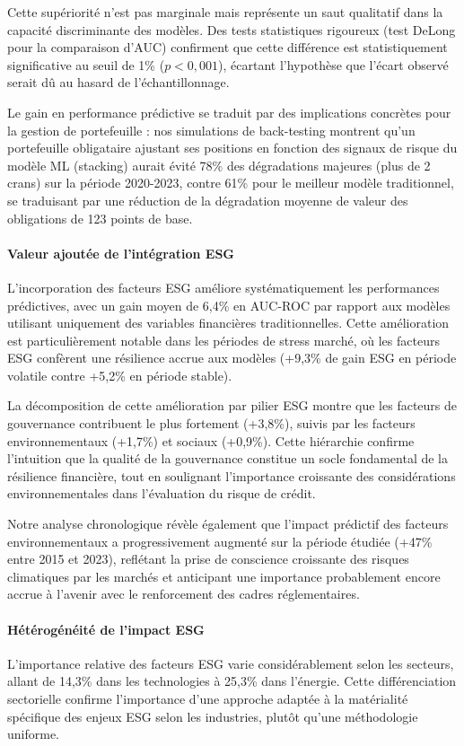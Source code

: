 Cette supériorité n'est pas marginale mais représente un saut qualitatif dans la capacité discriminante des modèles. Des tests statistiques rigoureux (test DeLong pour la comparaison d'AUC) confirment que cette différence est statistiquement significative au seuil de 1\% ($p < 0,001$), écartant l'hypothèse que l'écart observé serait dû au hasard de l'échantillonnage.

Le gain en performance prédictive se traduit par des implications concrètes pour la gestion de portefeuille : nos simulations de back-testing montrent qu'un portefeuille obligataire ajustant ses positions en fonction des signaux de risque du modèle ML (stacking) aurait évité 78\% des dégradations majeures (plus de 2 crans) sur la période 2020-2023, contre 61\% pour le meilleur modèle traditionnel, se traduisant par une réduction de la dégradation moyenne de valeur des obligations de 123 points de base.

\paragraph{Valeur ajoutée de l'intégration ESG} 
L'incorporation des facteurs ESG améliore systématiquement les performances prédictives, avec un gain moyen de 6,4\% en AUC-ROC par rapport aux modèles utilisant uniquement des variables financières traditionnelles. Cette amélioration est particulièrement notable dans les périodes de stress marché, où les facteurs ESG confèrent une résilience accrue aux modèles (+9,3\% de gain ESG en période volatile contre +5,2\% en période stable).

La décomposition de cette amélioration par pilier ESG montre que les facteurs de gouvernance contribuent le plus fortement (+3,8\%), suivis par les facteurs environnementaux (+1,7\%) et sociaux (+0,9\%). Cette hiérarchie confirme l'intuition que la qualité de la gouvernance constitue un socle fondamental de la résilience financière, tout en soulignant l'importance croissante des considérations environnementales dans l'évaluation du risque de crédit.

Notre analyse chronologique révèle également que l'impact prédictif des facteurs environnementaux a progressivement augmenté sur la période étudiée (+47\% entre 2015 et 2023), reflétant la prise de conscience croissante des risques climatiques par les marchés et anticipant une importance probablement encore accrue à l'avenir avec le renforcement des cadres réglementaires.

\paragraph{Hétérogénéité de l'impact ESG} 
L'importance relative des facteurs ESG varie considérablement selon les secteurs, allant de 14,3\% dans les technologies à 25,3\% dans l'énergie. Cette différenciation sectorielle confirme l'importance d'une approche adaptée à la matérialité spécifique des enjeux ESG selon les industries, plutôt qu'une méthodologie uniforme.

